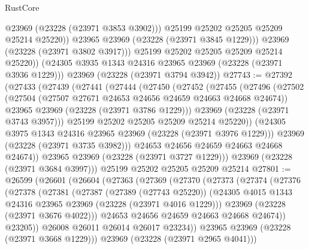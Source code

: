 \begin{lexlean}{RustCore}
\begin{coremodule}
                  @23969
                  (@23228 (@23971 @3853 @3902)))
                @25199
                @25202
                @25205
                @25209
                @25214
                @25220))
            @23965
            @23969
            (@23228 (@23971 @3845 @1229)))
          @23969
          (@23228 (@23971 @3802 @3917)))
        @25199
        @25202
        @25205
        @25209
        @25214
        @25220))
    (@24305 @3935 @1343 @24316 @23965 @23969 (@23228 (@23971 @3936 @1229)))
    @23969
    (@23228 (@23971 @3794 @3942))
@27743 := @27392
    (@27433
      (@27439
        (@27441
          (@27444
            (@27450
              (@27452
                (@27455
                  (@27496
                    (@27502
                      (@27504 (@27507 @27671 @24653 @24656 @24659 @24663 @24668 @24674))
                      @23965
                      @23969
                      (@23228 (@23971 @3786 @1229)))
                    @23969
                    (@23228 (@23971 @3743 @3957)))
                  @25199
                  @25202
                  @25205
                  @25209
                  @25214
                  @25220))
              (@24305 @3975 @1343 @24316 @23965 @23969 (@23228 (@23971 @3976 @1229)))
              @23969
              (@23228 (@23971 @3735 @3982)))
            @24653
            @24656
            @24659
            @24663
            @24668
            @24674))
        @23965
        @23969
        (@23228 (@23971 @3727 @1229)))
      @23969
      (@23228 (@23971 @3684 @3997)))
    @25199
    @25202
    @25205
    @25209
    @25214
@27801 := @26599
    (@26601
      (@26604
        (@27363
          (@27369
            (@27370
              (@27373
                (@27374
                  (@27376
                    (@27378
                      (@27381
                        (@27387
                          (@27389 (@27743 @25220))
                          (@24305 @4015 @1343 @24316 @23965 @23969 (@23228 (@23971 @4016 @1229)))
                          @23969
                          (@23228 (@23971 @3676 @4022)))
                        @24653
                        @24656
                        @24659
                        @24663
                        @24668
                        @24674))
                    @23205))
                @26008
                @26011
                @26014
                @26017
                @23234))
            @23965
            @23969
            (@23228 (@23971 @3668 @1229)))
          @23969
          (@23228 (@23971 @2965 @4041)))

\end{coremodule}
\end{lexlean}
